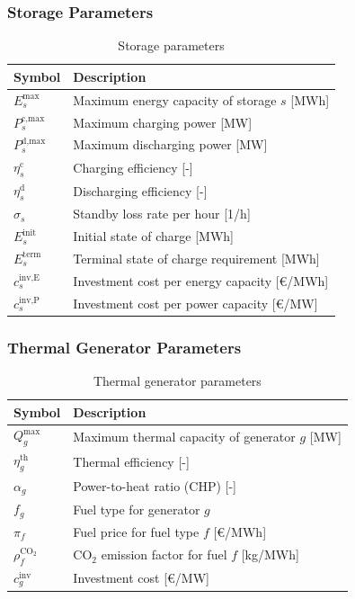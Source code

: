 \documentclass[11pt]{article}
\begin{document}
\subsubsection{Storage Parameters}

\begin{table}[h]
\centering
\begin{tabular}{ll}
\toprule
\textbf{Symbol} & \textbf{Description} \\
\midrule
$E_s^{\text{max}}$ & Maximum energy capacity of storage $s$ [MWh] \\
$P_s^{\text{c,max}}$ & Maximum charging power [MW] \\
$P_s^{\text{d,max}}$ & Maximum discharging power [MW] \\
$\eta_s^{\text{c}}$ & Charging efficiency [-] \\
$\eta_s^{\text{d}}$ & Discharging efficiency [-] \\
$\sigma_s$ & Standby loss rate per hour [1/h] \\
$E_s^{\text{init}}$ & Initial state of charge [MWh] \\
$E_s^{\text{term}}$ & Terminal state of charge requirement [MWh] \\
$c_s^{\text{inv,E}}$ & Investment cost per energy capacity [\euro/MWh] \\
$c_s^{\text{inv,P}}$ & Investment cost per power capacity [\euro/MW] \\
\bottomrule
\end{tabular}
\caption{Storage parameters}
\label{tab:params_storage}
\end{table}

\subsubsection{Thermal Generator Parameters}

\begin{table}[h]
\centering
\begin{tabular}{ll}
\toprule
\textbf{Symbol} & \textbf{Description} \\
\midrule
$Q_g^{\text{max}}$ & Maximum thermal capacity of generator $g$ [MW] \\
$\eta_g^{\text{th}}$ & Thermal efficiency [-] \\
$\alpha_g$ & Power-to-heat ratio (CHP) [-] \\
$f_g$ & Fuel type for generator $g$ \\
$\pi_f$ & Fuel price for fuel type $f$ [\euro/MWh] \\
$\rho_f^{\text{CO}_2}$ & CO$_2$ emission factor for fuel $f$ [kg/MWh] \\
$c_g^{\text{inv}}$ & Investment cost [\euro/MW] \\
\bottomrule
\end{tabular}
\caption{Thermal generator parameters}
\label{tab:params_gen}
\end{table}
\end{document}

